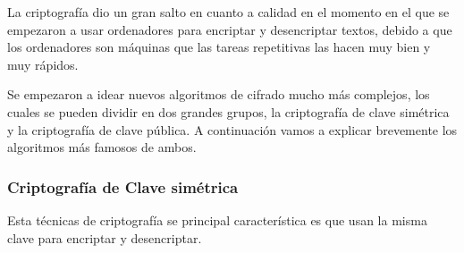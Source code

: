 La criptografía dio un gran salto en cuanto a calidad en el momento en el que se empezaron a usar ordenadores para encriptar y desencriptar textos, debido a que los ordenadores son máquinas que las tareas repetitivas las hacen muy bien y muy rápidos.

Se empezaron a idear nuevos algoritmos de cifrado mucho más complejos, los cuales se pueden dividir en dos grandes grupos, la criptografía de clave simétrica y la criptografía de clave pública. A continuación vamos a explicar brevemente los algoritmos más famosos de ambos.

\subsubsection*{Criptografía de Clave simétrica}
	
Esta técnicas de criptografía se principal característica es que usan la misma clave para encriptar y desencriptar.
